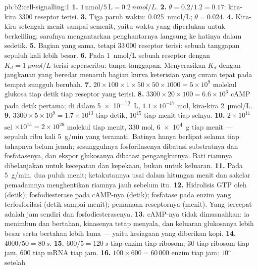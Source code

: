 \begin{solution}{pb:b2:cell-signalling:1}
\textbf{1.} $1\,\text{nmol}/5\,\text{L} = \qty{0.2}{nmol/L}$.
\textbf{2.} $\theta = 0.2/1.2 = 0.17$: kira-kira 3300 reseptor terisi.
\textbf{3.} Tiga paruh waktu: \qty{0.025}{nmol/L}; $\theta = 0.024$.
\textbf{4.} Kira-kira setengah menit sampai semenit, yaitu waktu yang
diperlukan  untuk berkeliling; sarafnya mengantarkan
penghantarnya langsung ke hatinya dalam sedetik.
\textbf{5.} Bagian yang sama, tetapi $33\,000$ reseptor terisi: sebuah
tanggapan sepuluh kali lebih besar.
\textbf{6.} Pada \qty{1}{nmol/L} sebuah reseptor dengan $K_d = \qty{1}{\micro
mol/L}$ terisi seperseribu: tanpa tanggapan. Menyerasikan $K_d$ dengan
jangkauan yang beredar menaruh bagian kurva keterisian yang curam tepat
pada tempat  sungguh berubah.
\textbf{7.} $20\times 100\times 1\times 50\times 50\times 1000 =
5\times 10^{9}$ molekul glukosa tiap detik tiap reseptor yang terisi.
\textbf{8.} $3300\times 20\times 100 = 6.6\times 10^{6}$ cAMP pada
detik pertama; di dalam \qty{5e-12}{L}, $1.1\times 10^{-17}$ mol,
kira-kira \qty{2}{\micro mol/L}.
\textbf{9.} $3300\times 5\times 10^{9} = 1.7\times 10^{13}$ tiap detik, $10^{15}$
tiap menit tiap selnya.
\textbf{10.} $2\times 10^{11}$ sel $\times 10^{15} = 2\times
10^{26}$ molekul tiap menit, 330 mol, \qty{6e4}{g} tiap menit ---
sepuluh ribu kali \qty{5}{g/min} yang teramati. Batinya hanya
berlipat selama tiap tahapnya belum jenuh; sesungguhnya fosforilasenya
dibatasi substratnya dan fosfatasenya, dan ekspor glukosanya dibatasi
pengangkutnya. Bati riamnya dibelanjakan untuk kecepatan dan kepekaan,
bukan untuk keluaran.
\textbf{11.} Pada \qty{5}{g/min}, dua puluh menit; ketakutannya usai
dalam hitungan menit dan sakelar pemadamnya menghentikan riamnya jauh
sebelum itu.
\textbf{12.} Hidrolisis GTP oleh  (detik);
fosfodiesterase pada cAMP-nya (detik); fosfatase pada enzim yang
terfosforilasi (detik sampai menit); pemanaan reseptornya (menit). Yang
tercepat adalah jam  sendiri dan fosfodiesterasenya.
\textbf{13.} cAMP-nya tidak dimusnahkan: ia menimbun dan bertahan,
kinasenya tetap menyala, dan keluaran glukosanya lebih besar serta
bertahan lebih lama --- yaitu kesiagaan yang diberikan kopi.
\textbf{14.} $4000/50 = \qty{80}{s}$.
\textbf{15.} $600/5 = \qty{120}{s}$ tiap enzim tiap ribosom; 30 tiap
ribosom tiap jam, 600 tiap mRNA tiap jam.
\textbf{16.} $100\times 600 = 60\,000$ enzim tiap jam; $10^{5}$ setelah

\end{solution}
